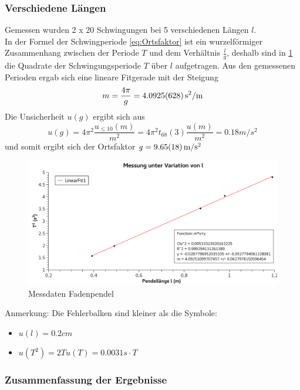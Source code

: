\documentclass[
	a4paper,
	12pt,
	pagesize,
	ngerman
]{scrartcl}
\begin{document}
	\subsubsection{Verschiedene Längen}
	Gemessen wurden 2 x 20 Schwingungen bei 5 verschiedenen Längen $l$. \\
	In der Formel der Schwingperiode \eqref{eq:Ortsfaktor} ist ein wurzelförmiger Zusammenhang zwischen der Periode $T$ und dem Verhältnis $\frac{l}{g}$, deshalb sind in \cref{Messdaten} die Quadrate der Schwingungsperiode $T$ über $l$ aufgetragen. Aus den gemessenen Perioden ergab sich eine lineare Fitgerade mit der Steigung %
	\begin{equation*} 
		m = \frac{4\pi}{g} = \SI{4.0925 +- 0.0628 }{s^2/m}  
	\end{equation*}
	Die Unsicherheit $u(g)$ ergibt sich aus
	\begin{equation*}
		u(g) = 4\pi^2\frac{u_{\leq10}(m)}{m^2} = 4\pi^2t_{68}(3)\frac{u(m)}{m^2} = 0.18 \si{m/s^2}
	\end{equation*}
	und somit ergibt sich der Ortsfaktor  $g = \SI{9.65  +- 0.18}{m/s^2}$


	\begin{figure}[htb]
		\includegraphics[width=1\textwidth]{Graph}
		\centering
		\caption{Messdaten Fadenpendel}
		\label{Messdaten}
		\centering
	\end{figure}

	Anmerkung: Die Fehlerbalken sind kleiner als die Symbole:
	\begin{itemize}
		\item $u(l)= 0.2 \si{cm} $
		\item $u(T^2) = 2 T u(T) = 0.0031 s \cdot T $
	\end{itemize}

	\subsubsection{Zusammenfassung der Ergebnisse}
\end{document}
